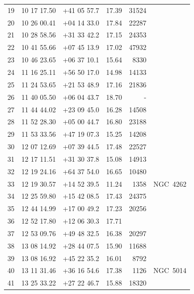 \documentclass[useAMS,usenatbib]{mn2e}
\begin{document}
\begin{table}
\begin{tabular}{rrrlrl}
  19 &  10 17 17.50 & +41 05 57.7 &  17.39 &  31524 &                  \\
  20 &  10 26 00.41 & +04 14 33.0 &  17.84 &  22287 &                  \\
  21 &  10 28 58.56 & +31 33 42.2 &  17.15 &  24353 &                  \\
  22 &  10 41 55.66 & +07 45 13.9 &  17.02 &  47932 &                  \\
  23 &  10 46 23.65 & +06 37 10.1 &  15.64 &   8330 &                  \\
  24 &  11 16 25.11 & +56 50 17.0 &  14.98 &  14133 &                  \\
  25 &  11 24 53.65 & +21 53 48.9 &  17.16 &  21836 &                  \\
  26 &  11 40 05.50 & +06 04 43.7 &  18.70 &      - &                  \\
  27 &  11 44 44.02 & +23 09 45.0 &  16.28 &  14508 &                  \\
  28 &  11 52 28.30 & +05 00 44.7 &  16.80 &  23188 &                  \\
  29 &  11 53 33.56 & +47 19 07.3 &  15.25 &  14208 &                  \\
  30 &  12 07 12.69 & +07 39 44.5 &  17.48 &  22527 &                  \\
  31 &  12 17 11.51 & +31 30 37.8 &  15.08 &  14913 &                  \\
  32 &  12 19 24.16 & +64 37 54.0 &  16.65 &  10480 &                  \\
  33 &  12 19 30.57 & +14 52 39.5 &  11.24 &   1358 &        NGC~4262  \\
  34 &  12 25 59.80 & +15 42 08.5 &  17.43 &  24375 &                  \\
  35 &  12 44 14.99 & +17 00 49.2 &  17.23 &  20256 &                  \\
  36 &  12 52 17.80 & +12 06 30.3 &  17.71 &        &                  \\
  37 &  12 53 09.76 & +49 48 32.5 &  16.38 &  20297 &                  \\
  38 &  13 08 14.92 & +28 44 07.5 &  15.90 &  11688 &                  \\
  39 &  13 08 16.92 & +45 22 35.2 &  16.01 &   8792 &                  \\
  40 &  13 11 31.46 & +36 16 54.6 &  17.38 &   1126 &        NGC~5014  \\
  41 &  13 25 33.22 & +27 22 46.7 &  15.88 &  18320 &                  \\

\end{tabular}
\end{table}
\end{document}
